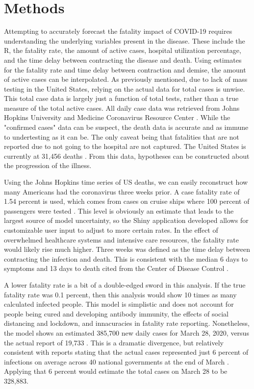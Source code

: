 \section{Methods}
\label{Methods}

Attempting to accurately forecast the fatality impact of COVID-19 requires understanding the underlying variables present in the disease.  These include the R, the fatality rate, the amount of active cases, hospital utilization percentage, and the time delay between contracting the disease and death.  Using estimates for the fatality rate and time delay between contraction and demise, the amount of active cases can be interpolated.  As previously mentioned, due to lack of mass testing in the United States, relying on the actual data for total cases is unwise.  This total case data is largely just a function of total tests, rather than a true measure of the total active cases.  All daily case data was retrieved from Johns Hopkins University and Medicine Coronavirus Resource Center \cite{JHU}. While the "confirmed cases" data can be suspect, the death data is accurate and as immune to undertesting as it can be.  The only caveat being that fatalities that are not reported due to not going to the hospital are not captured.  The United States is currently at 31,456 deaths \cite{JHU}.  From this data, hypotheses can be constructed about the progression of the illness.

Using the Johns Hopkins time series of US deaths, we can easily reconstruct how many Americans had the coronavirus three weeks prior.  A case fatality rate of 1.54 percent is used, which comes from cases on cruise ships where 100 percent of passengers were tested \cite{ships}.  This level is obviously an estimate that leads to the largest source of model uncertainty, so the Shiny application developed allows for customizable user input to adjust to more certain rates. In the effect of overwhelmed healthcare systems and intensive care resources, the fatality rate would likely rise much higher.  Three weeks was defined as the time delay between contracting the infection and death.  This is consistent with the median 6 days to symptoms and 13 days to death cited from the Center of Disease Control \cite{cdc}.

A lower fatality rate is a bit of a double-edged sword in this analysis.  If the true fatality rate was 0.1 percent, then this analysis would show 10 times as many calculated infected people.  This model is simplistic and does not account for people being cured and developing antibody immunity, the effects of social distancing and lockdown, and innacuracies in fatality rate reporting.  Nonetheless, the model shows an estimated 385,700 new daily cases for March 28, 2020, versus the actual report of 19,733 \cite{JHU}.  This is a dramatic divergence, but relatively consistent with reports stating that the actual cases represented just 6 percent of infections on average across 40 national governments at the end of March \cite{reason}.  Applying that 6 percent would estimate the total cases on March 28 to be 328,883.

